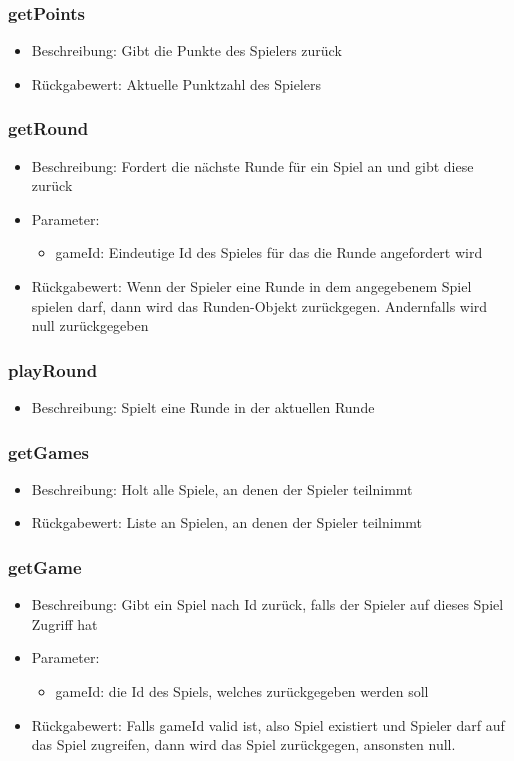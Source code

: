 \documentclass[a4paper]{scrreprt}
\begin{document}
	\subsubsection{getPoints}
	\begin{itemize}
		\item Beschreibung: Gibt die Punkte des Spielers zurück
		\item Rückgabewert: Aktuelle Punktzahl des Spielers
	\end{itemize}
	\subsubsection{getRound}
	\begin{itemize}
		\item Beschreibung: Fordert die nächste Runde für ein Spiel an und gibt diese zurück
		\item Parameter:
		\begin{itemize}
			\item gameId: Eindeutige Id des Spieles für das die Runde angefordert wird
		\end{itemize}
		\item Rückgabewert: Wenn der Spieler eine Runde in dem angegebenem Spiel spielen darf, dann wird das Runden-Objekt zurückgegen. Andernfalls wird null zurückgegeben
	\end{itemize}
	\subsubsection{playRound}
	\begin{itemize}
		\item Beschreibung: Spielt eine Runde in der aktuellen Runde
	\end{itemize}
	\subsubsection{getGames}
	\begin{itemize}
		\item Beschreibung: Holt alle Spiele, an denen der Spieler teilnimmt
		\item Rückgabewert: Liste an Spielen, an denen der Spieler teilnimmt
	\end{itemize}
	\subsubsection{getGame}
	\begin{itemize}
		\item Beschreibung: Gibt ein Spiel nach Id zurück, falls der Spieler auf dieses Spiel Zugriff hat
		\item Parameter:
		\begin{itemize}
			\item gameId: die Id des Spiels, welches zurückgegeben werden soll
		\end{itemize}
		\item Rückgabewert: Falls gameId valid ist, also Spiel existiert und Spieler darf auf das Spiel zugreifen, dann wird das Spiel zurückgegen, ansonsten null.
	\end{itemize}
\end{document}

